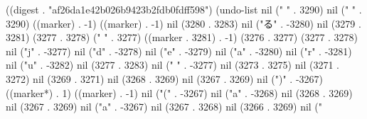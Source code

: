
((digest . "af26da1e42b026b9423b2fdb0fdff598") (undo-list nil (" " . 3290) nil ("
" . 3290) ((marker) . -1) ((marker) . -1) nil (3280 . 3283) nil ("る" . -3280) nil (3279 . 3281) (3277 . 3278) (" " . 3277) ((marker . 3281) . -1) (3276 . 3277) (3277 . 3278) nil ("j" . -3277) nil ("d" . -3278) nil ("e" . -3279) nil ("a" . -3280) nil ("r" . -3281) nil ("u" . -3282) nil (3277 . 3283) nil (" " . -3277) nil (3273 . 3275) nil (3271 . 3272) nil (3269 . 3271) nil (3268 . 3269) nil (3267 . 3269) nil (")" . -3267) ((marker*) . 1) ((marker) . -1) nil ("(" . -3267) nil ("a" . -3268) nil (3268 . 3269) nil (3267 . 3269) nil ("a" . -3267) nil (3267 . 3268) nil (3266 . 3269) nil ("%
